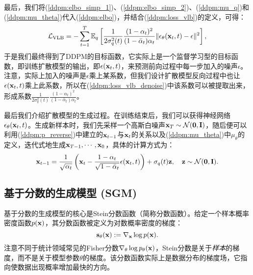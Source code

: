 \documentclass[11pt,a4paper,UTF8]{ctexart}
\begin{document}
最后，我们将(\ref{ddpm:elbo_simp_1})、(\ref{ddpm:elbo_simp_2})、(\ref{ddpm:mu_q})和(\ref{ddpm:mu_theta})代入(\ref{ddpm:elbo})，并结合(\ref{ddpm:loss_vlb})的定义，可得：
\begin{equation}
\mathcal{L}_{\text{VLB}} = -\sum_{t=1}^T \mathbb{E}_q \left[\frac{1}{2\sigma_q^2(t)}\frac{(1-\alpha_t)^2}{(1-\bar{\alpha}_t)\alpha_t}\|\epsilon_{\theta}(\mathbf{x}_t,t)-\epsilon \|^2 \right],
\label{ddpm:loss_vlb_denoise}
\end{equation}
于是我们最终得到了DDPM的目标函数，它实际上是一个监督学习型的目标函数，即训练扩散模型的输出，即$\epsilon(\mathbf{x}_t,t)$，来预测前向过程中每一步加入的噪声$\epsilon$。注意，实际上加入的噪声是$\epsilon$乘上某系数，但我们设计扩散模型反向过程中也让$\epsilon(\mathbf{x}_t,t)$乘上此系数，所以在(\ref{ddpm:loss_vlb_denoise})中该系数可以被提取出来，形成系数$\frac{1}{2\sigma_q^2(t)}\frac{(1-\alpha_t)^2}{(1-\bar{\alpha}_t)\alpha_t}$。

最后我们介绍扩散模型的生成过程。在训练结束后，我们可以获得神经网络$\epsilon_{\theta}(\mathbf{x}_t,t)$。生成新样本时，我们先采样一个高斯白噪声$\mathbf{x}_T\sim\mathcal{N}(\mathbf{0},\mathbf{I})$，随后便可以利用(\ref{ddpm:p_reverse})中建立的$\mathbf{x}_{t-1}$与$\mathbf{x}_t$的关系以及(\ref{ddpm:mu_theta})中$\mu_\theta$的定义，迭代式地生成$\mathbf{x}_{T-1},\cdots,\mathbf{x}_0$，具体的计算方式为：
\begin{equation*}
    \mathbf{x}_{t-1} = \frac{1}{\sqrt{\alpha_t}}\left(\mathbf{x}_t -\frac{1-\alpha_t}{\sqrt{1-\bar{\alpha}_t}} \epsilon(\mathbf{x}_t,t) \right) + \sigma_q(t)\mathbf{z},\quad \mathbf{z}\sim\mathcal{N}(\mathbf{0},\mathbf{I}).
\end{equation*}

\subsection{基于分数的生成模型 (SGM)}

基于分数的生成模型的核心是Stein分数函数（简称分数函数）\cite{Hyvrinen2005EstimationON}。给定一个样本概率密度函数$p(\mathbf{x})$，其分数函数被定义为对数概率密度的梯度：
\begin{equation*}
    \mathbf{s}_\theta(\mathbf{x}) := \nabla_{\mathbf{x}}\log p(\mathbf{x}).
\end{equation*}
注意不同于统计领域常见的Fisher分数$\nabla_\theta \log p_{\theta}(\mathbf{x})$，Stein分数是关于\emph{样本}的梯度，而不是关于模型参数$\theta$的梯度。该分数函数实际上是数据分布的梯度场，它指向使数据出现概率增加最快的方向。
\end{document}
